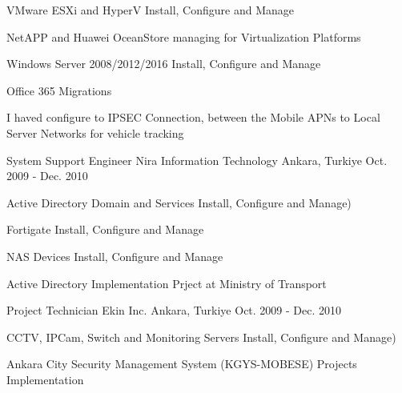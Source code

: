 \begin{cventries}
{\begin{cvitems}
        \item {VMware ESXi and HyperV Install, Configure and Manage}
        \item {NetAPP and Huawei OceanStore managing for Virtualization Platforms}
        \item {Windows Server 2008/2012/2016 Install, Configure and Manage}
        \item {Office 365 Migrations}
        \item {I haved configure to IPSEC Connection, between the Mobile APNs to Local Server Networks for vehicle tracking}
      \end{cvitems} 
    }

\cventry
    {System Support Engineer} %
    {Nira Information Technology} %
    {Ankara, Turkiye} %
    {Oct. 2009 - Dec. 2010} %
    {
      \begin{cvitems} %
        \item {Active Directory Domain and Services Install, Configure and Manage)}
        \item {Fortigate Install, Configure and Manage}
        \item {NAS Devices Install, Configure and Manage}
        \item {Active Directory Implementation Prject at Ministry of Transport}
        \end{cvitems} 
    }
 \cventry
    {Project Technician} %
    {Ekin Inc.} %
    {Ankara, Turkiye} %
    {Oct. 2009 - Dec. 2010} %
    {
      \begin{cvitems} %
        \item {CCTV, IPCam, Switch and Monitoring Servers Install, Configure and Manage)}
        \item {Ankara City Security Management System (KGYS-MOBESE) Projects Implementation}
      \end{cvitems} 
    }
\end{cventries}